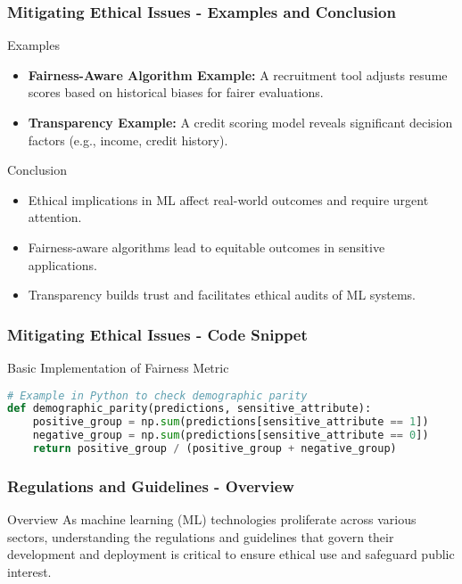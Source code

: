 \documentclass[aspectratio=169]{beamer}
\begin{document}
\begin{frame}[fragile]
    \frametitle{Mitigating Ethical Issues - Examples and Conclusion}
    \begin{block}{Examples}
        \begin{itemize}
            \item \textbf{Fairness-Aware Algorithm Example:}
                A recruitment tool adjusts resume scores based on historical biases for fairer evaluations.
                
            \item \textbf{Transparency Example:}
                A credit scoring model reveals significant decision factors (e.g., income, credit history).
        \end{itemize}
    \end{block}
    
    \begin{block}{Conclusion}
        \begin{itemize}
            \item Ethical implications in ML affect real-world outcomes and require urgent attention.
            \item Fairness-aware algorithms lead to equitable outcomes in sensitive applications.
            \item Transparency builds trust and facilitates ethical audits of ML systems.
        \end{itemize}
    \end{block}
\end{frame}

\begin{frame}[fragile]
    \frametitle{Mitigating Ethical Issues - Code Snippet}
    \begin{block}{Basic Implementation of Fairness Metric}
        \begin{lstlisting}[language=Python]
# Example in Python to check demographic parity
def demographic_parity(predictions, sensitive_attribute):
    positive_group = np.sum(predictions[sensitive_attribute == 1])
    negative_group = np.sum(predictions[sensitive_attribute == 0])
    return positive_group / (positive_group + negative_group)
        \end{lstlisting}
    \end{block}
\end{frame}

\begin{frame}[fragile]
    \frametitle{Regulations and Guidelines - Overview}
    \begin{block}{Overview}
        As machine learning (ML) technologies proliferate across various sectors, understanding the regulations and guidelines that govern their development and deployment is critical to ensure ethical use and safeguard public interest.
    \end{block}
\end{frame}
\end{document}
